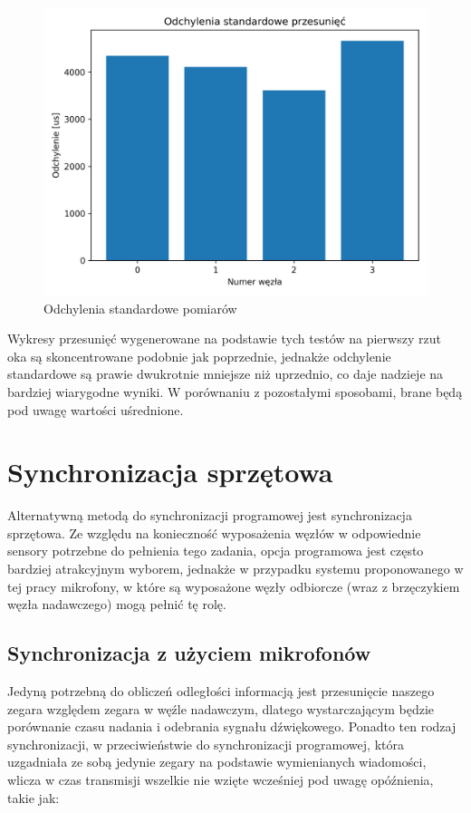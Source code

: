 \begin{figure}[H]
    \centering
    \includegraphics[width=.49\textwidth]{pics/time_deltas/stddev.png}
    \caption{Odchylenia standardowe pomiarów}
    \label{pic:stddev_deltas}
\end{figure}

Wykresy przesunięć wygenerowane na podstawie tych testów na pierwszy rzut oka są skoncentrowane podobnie jak poprzednie, jednakże odchylenie standardowe są prawie dwukrotnie mniejsze niż uprzednio, co daje nadzieje na bardziej wiarygodne wyniki. W porównaniu z pozostałymi sposobami, brane będą pod uwagę wartości uśrednione.

\section{Synchronizacja sprzętowa}

Alternatywną metodą do synchronizacji programowej jest synchronizacja sprzętowa. Ze względu na konieczność wyposażenia węzłów w odpowiednie sensory potrzebne do pełnienia tego zadania, opcja programowa jest często bardziej atrakcyjnym wyborem, jednakże w przypadku systemu proponowanego w tej pracy mikrofony, w które są wyposażone węzły odbiorcze (wraz z brzęczykiem węzła nadawczego) mogą pełnić tę rolę.

\subsection{Synchronizacja z użyciem mikrofonów}\label{sec:mic_sync}

Jedyną potrzebną do obliczeń odległości informacją jest przesunięcie naszego zegara względem zegara w węźle nadawczym, dlatego wystarczającym będzie porównanie czasu nadania i odebrania sygnału dźwiękowego. Ponadto ten rodzaj synchronizacji, w przeciwieństwie do synchronizacji programowej, która uzgadniała ze sobą jedynie zegary na podstawie wymienianych wiadomości, wlicza w czas transmisji wszelkie nie wzięte wcześniej pod uwagę opóźnienia, takie jak:

